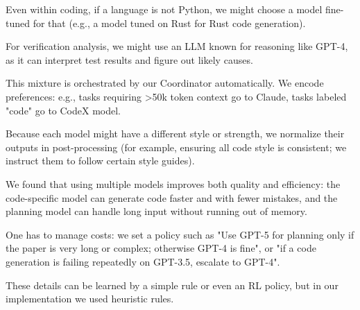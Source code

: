\documentclass{ieeeaccess}
\begin{document}
Even within coding, if a language is not Python, we might choose a model fine-tuned for that (e.g., a model tuned on Rust for Rust code generation).

For verification analysis, we might use an LLM known for reasoning like GPT-4, as it can interpret test results and figure out likely causes.

This mixture is orchestrated by our Coordinator automatically. We encode preferences: e.g., tasks requiring >50k token context go to Claude, tasks labeled "code" go to CodeX model.

Because each model might have a different style or strength, we normalize their outputs in post-processing (for example, ensuring all code style is consistent; we instruct them to follow certain style guides).

We found that using multiple models improves both quality and efficiency: the code-specific model can generate code faster and with fewer mistakes, and the planning model can handle long input without running out of memory.

One has to manage costs: we set a policy such as "Use GPT-5 for planning only if the paper is very long or complex; otherwise GPT-4 is fine", or "if a code generation is failing repeatedly on GPT-3.5, escalate to GPT-4".

These details can be learned by a simple rule or even an RL policy, but in our implementation we used heuristic rules.
\end{document}
